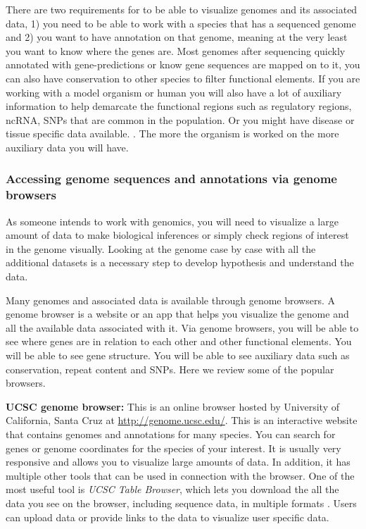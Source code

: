 \documentclass[12pt,]{krantz}
\theoremstyle{definition}
\theoremstyle{definition}
\theoremstyle{definition}
\theoremstyle{remark}
\begin{document}
There are two requirements for to be able to visualize genomes and its
associated data, 1) you need to be able to work with a species that has
a sequenced genome and 2) you want to have annotation on that genome,
meaning at the very least you want to know where the genes are. Most
genomes after sequencing quickly annotated with gene-predictions or know
gene sequences are mapped on to it, you can also have conservation to
other species to filter functional elements. If you are working with a
model organism or human you will also have a lot of auxiliary
information to help demarcate the functional regions such as regulatory
regions, ncRNA, SNPs that are common in the population. Or you might
have disease or tissue specific data available. . The more the organism
is worked on the more auxiliary data you will have.

\hypertarget{accessing-genome-sequences-and-annotations-via-genome-browsers}{%
\subsubsection{Accessing genome sequences and annotations via genome
browsers}\label{accessing-genome-sequences-and-annotations-via-genome-browsers}}

As someone intends to work with genomics, you will need to visualize a
large amount of data to make biological inferences or simply check
regions of interest in the genome visually. Looking at the genome case
by case with all the additional datasets is a necessary step to develop
hypothesis and understand the data.

Many genomes and associated data is available through genome browsers. A
genome browser is a website or an app that helps you visualize the
genome and all the available data associated with it. Via genome
browsers, you will be able to see where genes are in relation to each
other and other functional elements. You will be able to see gene
structure. You will be able to see auxiliary data such as conservation,
repeat content and SNPs. Here we review some of the popular browsers.

\textbf{UCSC genome browser:} This is an online browser hosted by
University of California, Santa Cruz at \url{http://genome.ucsc.edu/}.
This is an interactive website that contains genomes and annotations for
many species. You can search for genes or genome coordinates for the
species of your interest. It is usually very responsive and allows you
to visualize large amounts of data. In addition, it has multiple other
tools that can be used in connection with the browser. One of the most
useful tool is \emph{UCSC Table Browser}, which lets you download the
all the data you see on the browser, including sequence data, in
multiple formats . Users can upload data or provide links to the data to
visualize user specific data.
\end{document}
